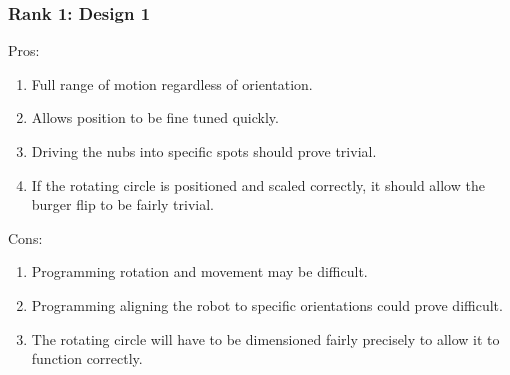 \documentclass[12pt]{extarticle}
\begin{document}
\subsubsection*{Rank 1: Design 1}
Pros:
\begin{enumerate}
    \item Full range of motion regardless of orientation.
    \item Allows position to be fine tuned quickly.
    \item Driving the nubs into specific spots should prove trivial.
    \item If the rotating circle is positioned and scaled correctly, it should allow the burger flip to be fairly trivial.
\end{enumerate}
Cons:
\begin{enumerate}
    \item Programming rotation and movement may be difficult.
    \item Programming aligning the robot to specific orientations could prove difficult.
    \item The rotating circle will have to be dimensioned fairly precisely to allow it to function correctly.
\end{enumerate}
\end{document}
